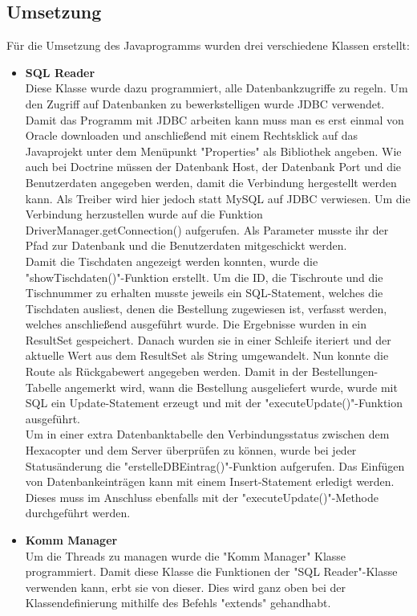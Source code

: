   \subsection{Umsetzung}
Für die Umsetzung des Javaprogramms wurden drei verschiedene Klassen erstellt:
\begin{itemize}
    \item \textbf{SQL Reader}\\
Diese Klasse wurde dazu programmiert, alle Datenbankzugriffe zu regeln.
Um den Zugriff auf Datenbanken zu bewerkstelligen wurde JDBC verwendet.
Damit das Programm mit JDBC arbeiten kann muss man es erst einmal von Oracle downloaden und anschließend mit einem Rechtsklick auf das Javaprojekt unter dem Menüpunkt "Properties" als Bibliothek angeben.
Wie auch bei Doctrine müssen der Datenbank Host, der Datenbank Port und die Benutzerdaten angegeben werden, damit die Verbindung hergestellt werden kann.
Als Treiber wird hier jedoch statt MySQL auf JDBC verwiesen.
Um die Verbindung herzustellen wurde auf die Funktion DriverManager.getConnection() aufgerufen. Als Parameter musste ihr der Pfad zur Datenbank und die Benutzerdaten mitgeschickt werden.
\\
Damit die Tischdaten angezeigt werden konnten, wurde die "showTischdaten()"-Funktion erstellt. Um die ID, die Tischroute und die Tischnummer zu erhalten musste jeweils ein SQL-Statement, welches die Tischdaten ausliest, denen die Bestellung zugewiesen ist, verfasst werden, welches anschließend ausgeführt wurde.
Die Ergebnisse wurden in ein ResultSet gespeichert. Danach wurden sie in einer Schleife iteriert und der aktuelle Wert aus dem ResultSet als String umgewandelt. Nun konnte die Route als Rückgabewert angegeben werden. Damit in der Bestellungen-Tabelle angemerkt wird, wann die Bestellung ausgeliefert wurde, wurde mit SQL ein Update-Statement erzeugt und mit der "executeUpdate()"-Funktion ausgeführt.
\\
Um in einer extra Datenbanktabelle den Verbindungsstatus zwischen dem Hexacopter und dem Server überprüfen zu können, wurde bei jeder Statusänderung die "erstelleDBEintrag()"-Funktion aufgerufen. Das Einfügen von Datenbankeinträgen kann mit einem Insert-Statement erledigt werden. Dieses muss im Anschluss ebenfalls mit der "executeUpdate()"-Methode durchgeführt werden.
    \item \textbf{Komm Manager}\\
Um die Threads zu managen wurde die "Komm Manager" Klasse programmiert.
Damit diese Klasse die Funktionen der "SQL Reader"-Klasse verwenden kann, erbt sie von dieser. Dies wird ganz oben bei der Klassendefinierung mithilfe des Befehls "extends" gehandhabt.

\end{itemize}
